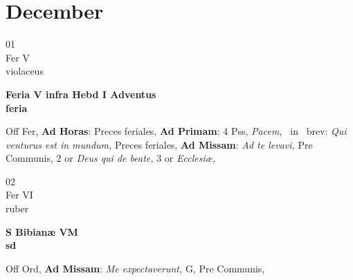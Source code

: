 \documentclass[10pt, openany]{book}
\begin{document}
        \chapter{December}
                        
        \begin{center}
            \begin{minipage}{3.5in}
                \vspace{2em}
                \begin{minipage}{0.5in}
                    {\Huge 01} \\
                    {\normalsize Fer V} \\
                    {\normalsize violaceus}
                \end{minipage}
                \begin{minipage}{3.0in}
                    \textbf{ \large Feria V infra Hebd I Adventus \\
                    \textnormal{\normalsize feria}} \\ 
                \end{minipage}
                \begin{justify}Off Fer, \textbf{Ad Horas}: Preces feriales, \textbf{Ad Primam}: 4 Pss, \textit{Pacem,} \Vbar\ in \Rbar\ brev: \textit{Qui venturus est in mundum,} Preces feriales, \textbf{Ad Missam}: \textit{Ad te levavi,} Pre Communis, 2 or \textit{Deus qui de beate,} 3 or \textit{Ecclesiæ,}   
                \end{justify}
            \end{minipage}
        \end{center}
    
        \begin{center}
            \begin{minipage}{3.5in}
                \vspace{2em}
                \begin{minipage}{0.5in}
                    {\Huge 02} \\
                    {\normalsize Fer VI} \\
                    {\normalsize ruber}
                \end{minipage}
                \begin{minipage}{3.0in}
                    \textbf{ \large S Bibianæ VM \\
                    \textnormal{\normalsize sd}} \\ 
                \end{minipage}
                \begin{justify}Off Ord, \textbf{Ad Missam}: \textit{Me expectaverunt,} G, Pre Communis,   
                \end{justify}
            \end{minipage}
        \end{center}
    
\end{document}
